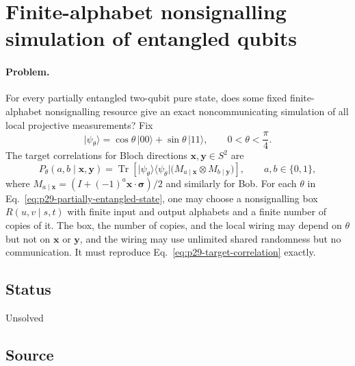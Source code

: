 \section{Finite-alphabet nonsignalling simulation of entangled qubits}
\label{sec:op_3db9de0ddc492750}

\paragraph{Problem.}
For every partially entangled two-qubit pure state, does some fixed
finite-alphabet nonsignalling resource give an exact noncommunicating
simulation of all local projective measurements?  Fix
\begin{equation}
  \lvert\psi_\theta\rangle
  =\cos\theta\,\lvert00\rangle+\sin\theta\,\lvert11\rangle,
  \qquad 0<\theta<\frac{\pi}{4}.
  \label{eq:p29-partially-entangled-state}
\end{equation}
The target correlations for Bloch directions
$\mathbf x,\mathbf y\in S^2$ are
\begin{equation}
  P_\theta(a,b\mid\mathbf x,\mathbf y)
  =\operatorname{Tr}\!\left[
    \lvert\psi_\theta\rangle\!\langle\psi_\theta\rvert
    \bigl(M_{a\mid\mathbf x}\otimes M_{b\mid\mathbf y}\bigr)
    \right],
  \qquad a,b\in\{0,1\},
  \label{eq:p29-target-correlation}
\end{equation}
where $M_{a\mid\mathbf x}=(I+(-1)^a\mathbf x\cdot\boldsymbol\sigma)/2$
and similarly for Bob.  For each $\theta$ in
Eq.~\eqref{eq:p29-partially-entangled-state}, one may choose a nonsignalling
box $R(u,v\mid s,t)$ with finite input and output alphabets and a finite
number of copies of it.  The box, the number of copies, and the local wiring
may depend on $\theta$ but not on $\mathbf x$ or $\mathbf y$, and the wiring
may use unlimited shared randomness but no communication.  It must reproduce
Eq.~\eqref{eq:p29-target-correlation} exactly.

\subsection*{Status}

Unsolved

\subsection*{Source}

